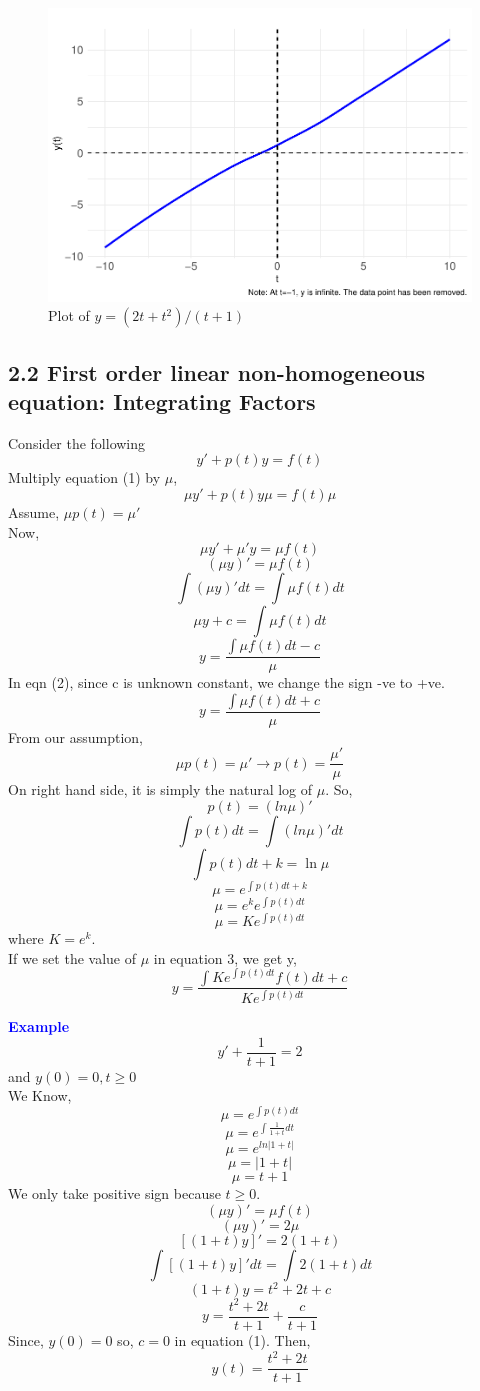 \documentclass[
  11pt,
]{article}
\begin{document}
\begin{figure}
\centering
\includegraphics{differential_files/figure-latex/difference5-1.pdf}
\caption{Plot of \(y=(2t+t^2)/(t+1)\)}
\end{figure}

\newpage

\subsection{2.2 First order linear non-homogeneous equation: Integrating
Factors}\label{first-order-linear-non-homogeneous-equation-integrating-factors}

Consider the following \[y'+p(t)y=f(t) \tag{1}\] Multiply equation (1)
by \(\mu\), \[\mu y'+p(t)y\mu=f(t)\mu\] Assume, \(\mu p(t) = \mu'\)\\
Now, \[\mu y'+\mu' y=\mu f(t)\] \[(\mu y)'=\mu f(t)\]
\[\int{(\mu y)'dt}=\int{\mu f(t)dt}\] \[\mu y +c = \int{\mu f(t)dt}\]
\[y = \frac{\int{\mu f(t)dt}-c}{\mu} \tag{2}\] In eqn (2), since c is
unknown constant, we change the sign -ve to +ve.
\[y = \frac{\int{\mu f(t)dt}+c}{\mu} \tag{3}\] From our assumption,
\[\mu p(t)=\mu' \longrightarrow p(t)=\frac{\mu'}{\mu}\] On right hand
side, it is simply the natural log of \(\mu\). So, \[p(t)=(ln\mu)'\]
\[\int{p(t)dt}=\int{(ln\mu)' dt}\] \[\int{p(t)dt+k}=\ln\mu\]
\[\mu = e^{\int{p(t)dt}+k}\] \[\mu = e^ke^{\int{p(t)dt}}\]
\[\mu = Ke^{\int{p(t)dt}} \tag{4}\] where \(K=e^k\).\\
If we set the value of \(\mu\) in equation 3, we get y,
\[y = \frac{\int{Ke^{\int{p(t)dt}} f(t)dt}+c}{Ke^{\int{p(t)dt}}} \tag{5}\]

\textbf{\textcolor{blue}{Example}} \[y' + \frac{1}{t+1}=2\] and
\(y(0)=0, t \geq 0\)\\
We Know, \[\mu = e^{\int{p(t)dt}}\] \[\mu = e^{\int{\frac{1}{1+t}dt}}\]
\[\mu = e^{ln|1+t|}\] \[\mu = |1+t|\] \[\mu = t+1\] We only take
positive sign because \(t \geq 0\). \[(\mu y)' = \mu f(t)\]
\[(\mu y)' = 2\mu\] \[[(1+t)y]'=2(1+t)\]
\[\int{[(1+t)y]'dt}=\int{2(1+t)dt}\] \[(1+t)y=t^2+2t+c\]
\[y=\frac{t^2+2t}{t+1}+\frac{c}{t+1} \tag{1}\] Since, \(y(0)=0\) so,
\(c = 0\) in equation (1). Then, \[y(t)=\frac{t^2+2t}{t+1} \tag{2}\]
\end{document}
